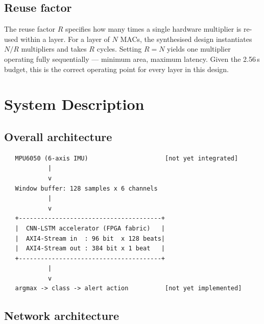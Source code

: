 \documentclass[11pt,a4paper]{article}
\begin{document}
\subsection{Reuse factor}

The reuse factor $R$ specifies how many times a single hardware multiplier is
re-used within a layer. For a layer of $N$ MACs, the synthesised design
instantiates $N/R$ multipliers and takes $R$ cycles. Setting $R = N$ yields one
multiplier operating fully sequentially --- minimum area, maximum latency.
Given the 2.56\,s budget, this is the correct operating point for every layer in
this design.

\section{System Description}

\subsection{Overall architecture}

\begin{verbatim}
   MPU6050 (6-axis IMU)                     [not yet integrated]
            |
            v
   Window buffer: 128 samples x 6 channels
            |
            v
   +---------------------------------------+
   |  CNN-LSTM accelerator (FPGA fabric)   |
   |  AXI4-Stream in  : 96 bit  x 128 beats|
   |  AXI4-Stream out : 384 bit x 1 beat   |
   +---------------------------------------+
            |
            v
   argmax -> class -> alert action          [not yet implemented]
\end{verbatim}

\subsection{Network architecture}
\end{document}

